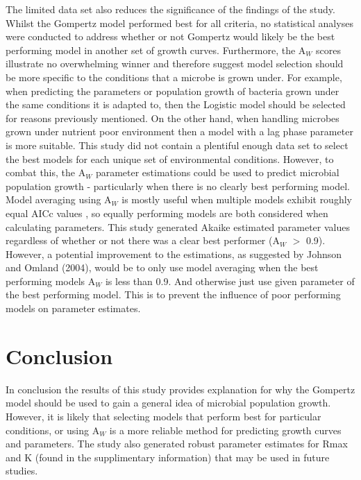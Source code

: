 \documentclass[12pt]{article}
\begin{document}
The limited data set also reduces the significance of the findings of the study. Whilst the Gompertz model performed best for all criteria, no statistical analyses were conducted to address whether or not Gompertz would likely be the best performing model in another set of growth curves. Furthermore, the $\mathrm{A}_{\textit{W}}$ scores illustrate no overwhelming winner and therefore suggest model selection should be more specific to the conditions that a microbe is grown under. For example, when predicting the parameters or population growth of bacteria grown under the same conditions it is adapted to, then the Logistic model should be selected for reasons previously mentioned. On the other hand, when handling microbes grown under nutrient poor environment then a model with a lag phase parameter is more suitable. This study did not contain a plentiful enough data set to select the best models for each unique set of environmental conditions. However, to combat this, the $\mathrm{A}_{\textit{W}}$ parameter estimations could be used to predict microbial population growth - particularly when there is no clearly best performing model. Model averaging using $\mathrm{A}_{\textit{W}}$ is mostly useful when multiple models exhibit roughly equal AICc values \cite{JOHNSON2004101}, so equally performing models are both considered when calculating parameters. This study generated Akaike estimated parameter values regardless of whether or not there was a clear best performer ($\mathrm{A}_{\textit{W}}$ $>$ 0.9). However, a potential improvement to the estimations, as suggested by Johnson and Omland (2004), would be to only use model averaging when the best performing models $\mathrm{A}_{\textit{W}}$ is less than 0.9. And otherwise just use given parameter of the best performing model. This is to prevent the influence of poor performing models on parameter estimates.

\section{Conclusion}
In conclusion the results of this study provides explanation for why the Gompertz model should be used to gain a general idea of microbial population growth. However, it is likely that selecting models that perform best for particular conditions, or using $\mathrm{A}_{\textit{W}}$ is a more reliable method for predicting growth curves and parameters. The study also generated robust parameter estimates for Rmax and K (found in the supplimentary information) that may be used in future studies.

  
  
  

  
\end{document}
